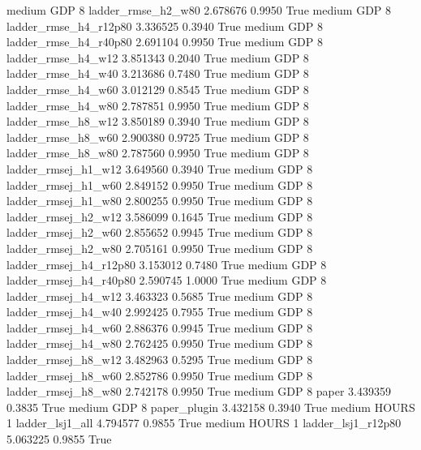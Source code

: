     medium      GDP                 8     ladder_rmse_h2_w80   2.678676      0.9950    True
    medium      GDP                 8  ladder_rmse_h4_r12p80   3.336525      0.3940    True
    medium      GDP                 8  ladder_rmse_h4_r40p80   2.691104      0.9950    True
    medium      GDP                 8     ladder_rmse_h4_w12   3.851343      0.2040    True
    medium      GDP                 8     ladder_rmse_h4_w40   3.213686      0.7480    True
    medium      GDP                 8     ladder_rmse_h4_w60   3.012129      0.8545    True
    medium      GDP                 8     ladder_rmse_h4_w80   2.787851      0.9950    True
    medium      GDP                 8     ladder_rmse_h8_w12   3.850189      0.3940    True
    medium      GDP                 8     ladder_rmse_h8_w60   2.900380      0.9725    True
    medium      GDP                 8     ladder_rmse_h8_w80   2.787560      0.9950    True
    medium      GDP                 8    ladder_rmsej_h1_w12   3.649560      0.3940    True
    medium      GDP                 8    ladder_rmsej_h1_w60   2.849152      0.9950    True
    medium      GDP                 8    ladder_rmsej_h1_w80   2.800255      0.9950    True
    medium      GDP                 8    ladder_rmsej_h2_w12   3.586099      0.1645    True
    medium      GDP                 8    ladder_rmsej_h2_w60   2.855652      0.9945    True
    medium      GDP                 8    ladder_rmsej_h2_w80   2.705161      0.9950    True
    medium      GDP                 8 ladder_rmsej_h4_r12p80   3.153012      0.7480    True
    medium      GDP                 8 ladder_rmsej_h4_r40p80   2.590745      1.0000    True
    medium      GDP                 8    ladder_rmsej_h4_w12   3.463323      0.5685    True
    medium      GDP                 8    ladder_rmsej_h4_w40   2.992425      0.7955    True
    medium      GDP                 8    ladder_rmsej_h4_w60   2.886376      0.9945    True
    medium      GDP                 8    ladder_rmsej_h4_w80   2.762425      0.9950    True
    medium      GDP                 8    ladder_rmsej_h8_w12   3.482963      0.5295    True
    medium      GDP                 8    ladder_rmsej_h8_w60   2.852786      0.9950    True
    medium      GDP                 8    ladder_rmsej_h8_w80   2.742178      0.9950    True
    medium      GDP                 8                  paper   3.439359      0.3835    True
    medium      GDP                 8           paper_plugin   3.432158      0.3940    True
    medium    HOURS                 1        ladder_lsj1_all   4.794577      0.9855    True
    medium    HOURS                 1     ladder_lsj1_r12p80   5.063225      0.9855    True
